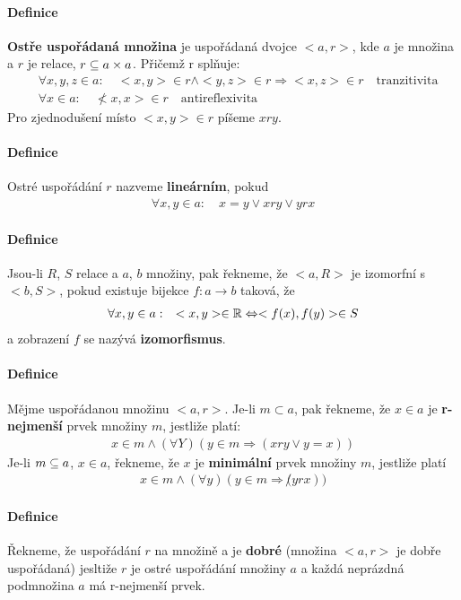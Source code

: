 \documentclass[a4paper,12pt,titlepage]{article}
\begin{document}
\paragraph{Definice}
\textbf{Ostře uspořádaná množina} je uspořádaná dvojce $<a, r>$, kde $a$ je
množina a $r$ je relace, $r \subseteq a \times a $. Přičemž r splňuje:
\begin{align}
	&\forall x, y, z \in a : \quad <x,y> \in r \land <y,z> \in r \Rightarrow
	<x,z> \in r \quad \text{tranzitivita} \\
	&\forall x \in a: \quad \not <x,x> \in r \quad \text{antireflexivita}
\end{align}
Pro zjednodušení místo $<x,y> \in r$ píšeme $x r y$.
\paragraph{Definice}
Ostré uspořádání $r$ nazveme \textbf{lineárním}, pokud 
\begin{align}
	\forall x,y \in a: \quad x = y \lor x r y \lor y r x 
\end{align}
\paragraph{Definice}
Jsou-li $R$, $S$ relace a $a$, $b$ množiny, pak řekneme, že $<a, R>$ je izomorfní
s $<b, S>$, pokud existuje bijekce $f: a\to b$ taková, že
\begin{align}
	\forall x,y \in a: \quad <x,y> \in \mathbb{R} \Leftrightarrow <f(x), f(y)> \in S
\end{align}
a zobrazení $f$ se nazývá \textbf{izomorfismus}.
\paragraph{Definice}
Mějme uspořádanou množinu $<a,r>$. Je-li $m \subset a$, pak řekneme, že $x \in a$
je \textbf{r-nejmenší} prvek množiny $m$, jestliže platí:
\begin{align}
	x \in m \land (\forall Y) (y \in m \Rightarrow (x r y \lor y = x))
\end{align}
Je-li $m \subseteq a$, $x \in a$, řekneme, že $x$ je \textbf{minimální} prvek
množiny $m$,
jestliže platí
\begin{align}
	x \in m \land (\forall y) ( y \in m \Rightarrow \not (y r x))
\end{align}
\paragraph{Definice}
Řekneme, že uspořádání $r$ na množině a je \textbf{dobré} (množina $<a,r>$ je dobře
uspořádaná) jesltiže $r$ je ostré uspořádání množiny $a$ a každá neprázdná
podmnožina $a$ má r-nejmenší prvek.
\end{document}
